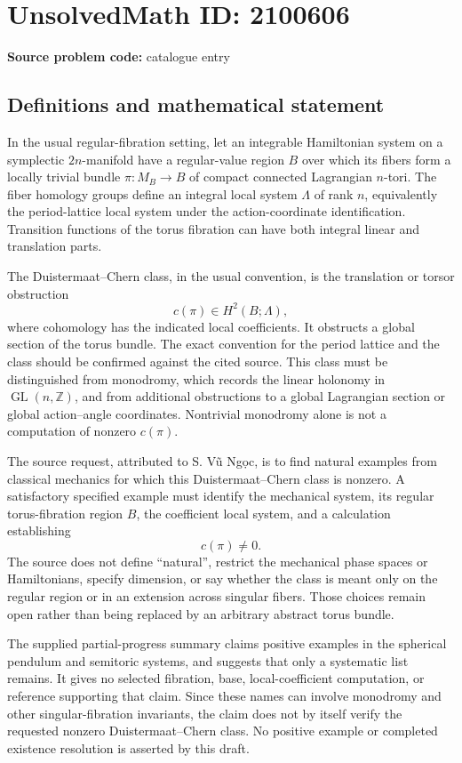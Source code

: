 \documentclass[11pt]{article}
\newcommand{\Z}{\mathbb{Z}}
\begin{document}
\section*{UnsolvedMath ID: 2100606}
\textbf{Source problem code:} catalogue entry
\subsection{Definitions and mathematical statement}
In the usual regular-fibration setting, let an integrable Hamiltonian system on a symplectic $2n$-manifold have a regular-value region $B$ over which its fibers form a locally trivial bundle $\pi:M_B\to B$ of compact connected Lagrangian $n$-tori. The fiber homology groups define an integral local system $\Lambda$ of rank $n$, equivalently the period-lattice local system under the action-coordinate identification. Transition functions of the torus fibration can have both integral linear and translation parts.

The Duistermaat--Chern class, in the usual convention, is the translation or torsor obstruction
\[
c(\pi)\in H^2(B;\Lambda),
\]
where cohomology has the indicated local coefficients. It obstructs a global section of the torus bundle. The exact convention for the period lattice and the class should be confirmed against the cited source. This class must be distinguished from monodromy, which records the linear holonomy in $\operatorname{GL}(n,\Z)$, and from additional obstructions to a global Lagrangian section or global action--angle coordinates. Nontrivial monodromy alone is not a computation of nonzero $c(\pi)$.

The source request, attributed to S. Vũ Ngọc, is to find natural examples from classical mechanics for which this Duistermaat--Chern class is nonzero. A satisfactory specified example must identify the mechanical system, its regular torus-fibration region $B$, the coefficient local system, and a calculation establishing
\[
c(\pi)\ne0.
\]
The source does not define ``natural'', restrict the mechanical phase spaces or Hamiltonians, specify dimension, or say whether the class is meant only on the regular region or in an extension across singular fibers. Those choices remain open rather than being replaced by an arbitrary abstract torus bundle.

The supplied partial-progress summary claims positive examples in the spherical pendulum and semitoric systems, and suggests that only a systematic list remains. It gives no selected fibration, base, local-coefficient computation, or reference supporting that claim. Since these names can involve monodromy and other singular-fibration invariants, the claim does not by itself verify the requested nonzero Duistermaat--Chern class. No positive example or completed existence resolution is asserted by this draft.
\end{document}
